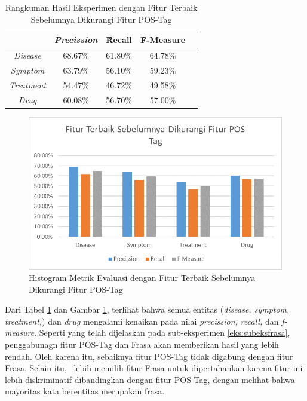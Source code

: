 	\begin{table}
		\centering
		\caption{Rangkuman Hasil Eksperimen dengan Fitur Terbaik Sebelumnya Dikurangi Fitur POS-Tag}
		\begin{tabular}{|c|c|c|c|c|}
			\hline
			                      & \textit{Precission} & \f{\f{Recall}} & \f{\f{F-Measure}} \\ \hline
			\textit{Disease}      & 68.67\%             & 61.80\%        & 64.78\%           \\ \hline
			\textit{Symptom}      & 63.79\%             & 56.10\%        & 59.23\%           \\ \hline
			\textit{Treatment}    & 54.47\%             & 46.72\%        & 49.58\%           \\ \hline
			\textit{Drug}		  & 60.08\%             & 56.70\%        & 57.00\%           \\ \hline
		\end{tabular}
		\label{table:owndict6}
	\end{table}
	
	\begin{figure}
		\centering
		\includegraphics[width=0.85\linewidth]{images/histogram6}
		\caption{Histogram Metrik Evaluasi dengan Fitur Terbaik Sebelumnya Dikurangi Fitur POS-Tag}
		\label{fig:owndict6}
	\end{figure}
	
	Dari Tabel \ref{table:owndict6} dan Gambar \ref{fig:owndict6}, terlihat bahwa semua entitas (\textit{disease, symptom, treatment,}) dan \textit{drug} mengalami kenaikan pada nilai \textit{precission, recall,} dan \textit{f-measure}. Seperti yang telah dijelaskan pada sub-eksperimen \ref{eks:subeksfrasa}, penggabunagn fitur POS-Tag dan Frasa akan memberikan hasil yang lebih rendah. Oleh karena itu, sebaiknya fitur POS-Tag tidak digabung dengan fitur Frasa. Selain itu, \saya~lebih memilih fitur Frasa untuk dipertahankan karena fitur ini lebih diskriminatif dibandingkan dengan fitur POS-Tag, dengan melihat bahwa mayoritas kata berentitas merupakan frasa.
	
